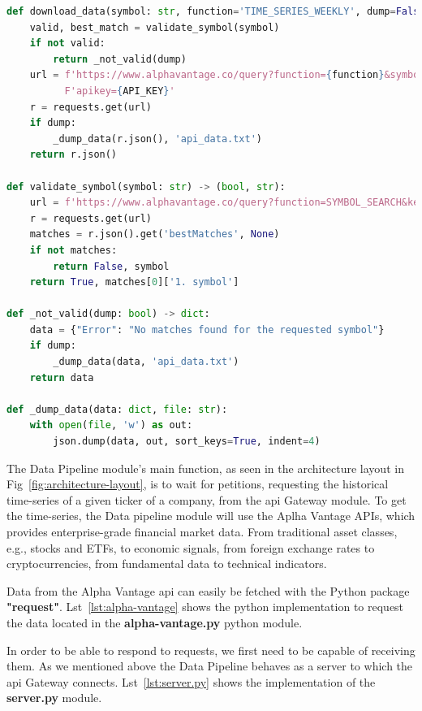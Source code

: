 \begin{lstlisting}[language=python,caption=aplha-vantage.py,label={lst:alpha-vantage}]
def download_data(symbol: str, function='TIME_SERIES_WEEKLY', dump=False) -> dict:
    valid, best_match = validate_symbol(symbol)
    if not valid:
        return _not_valid(dump)
    url = f'https://www.alphavantage.co/query?function={function}&symbol={best_match}&interval=5min&' \
          F'apikey={API_KEY}'
    r = requests.get(url)
    if dump:
        _dump_data(r.json(), 'api_data.txt')
    return r.json()

def validate_symbol(symbol: str) -> (bool, str):
    url = f'https://www.alphavantage.co/query?function=SYMBOL_SEARCH&keywords={symbol}&apikey={API_KEY}'
    r = requests.get(url)
    matches = r.json().get('bestMatches', None)
    if not matches:
        return False, symbol
    return True, matches[0]['1. symbol']

def _not_valid(dump: bool) -> dict:
    data = {"Error": "No matches found for the requested symbol"}
    if dump:
        _dump_data(data, 'api_data.txt')
    return data

def _dump_data(data: dict, file: str):
    with open(file, 'w') as out:
        json.dump(data, out, sort_keys=True, indent=4)
\end{lstlisting}

The Data Pipeline module's main function, as seen in the architecture layout in Fig~\ref{fig:architecture-layout}, is to wait for petitions, requesting the historical time-series of a given ticker of a company, from the \gls{api} Gateway module. To get the time-series, the Data pipeline module will use the Aplha Vantage APIs, which provides enterprise-grade financial market data. From traditional asset classes, e.g., stocks and ETFs, to economic signals, from foreign exchange rates to cryptocurrencies, from fundamental data to technical indicators.~\cite{alphaVantage}

Data from the Alpha Vantage \gls{api} can easily be fetched with the Python package \textbf{"request"}. Lst~\ref{lst:alpha-vantage} shows the python implementation to request the data located in the \textbf{alpha-vantage.py} python module.

In order to be able to respond to requests, we first need to be capable of receiving them. As we mentioned above the Data Pipeline behaves as a server to which the \gls{api} Gateway connects. Lst~\ref{lst:server.py} shows the implementation of the \textbf{server.py} module.

